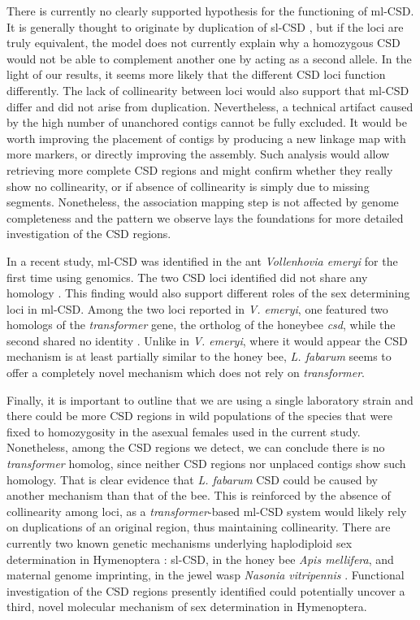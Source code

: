 \documentclass[11pt,a4paper]{report}
\begin{document}
There is currently no clearly supported hypothesis for the functioning of ml-CSD. It is generally thought to originate by duplication of sl-CSD  \citep{Boer2008ExperimentalVestalis,VanWilgenburg2006}, but if the loci are truly equivalent, the model does not currently explain why a homozygous CSD would not be able to complement another one by acting as a second allele. In the light of our results, it seems more likely that the different CSD loci function differently. The lack of collinearity between loci would also support that ml-CSD differ and did not arise from duplication. Nevertheless, a technical artifact caused by the high number of unanchored contigs cannot be fully excluded. It would be worth improving the placement of contigs by producing a new linkage map with more markers, or directly improving the assembly. Such analysis would allow retrieving more complete CSD regions and might confirm whether they really show no collinearity, or if absence of collinearity is simply due to missing segments. Nonetheless, the association mapping step is not affected by genome completeness and the pattern we observe lays the foundations for more detailed investigation of the CSD regions.  

In a recent study, ml-CSD was identified in the ant \textit{Vollenhovia emeryi} for the first time using genomics. The two CSD loci identified did not share any homology \citep{Miyakawa2015}. This finding would also support different roles of the sex determining loci in ml-CSD. Among the two loci reported in \textit{V. emeryi}, one featured two homologs of the \textit{transformer} gene, the ortholog of the honeybee \textit{csd}, while the second shared no identity \citep{Miyakawa2015}. Unlike in \textit{V. emeryi}, where it would appear the CSD mechanism is at least partially similar to the honey bee, \textit{L. fabarum} seems to offer a completely novel mechanism which does not rely on \textit{transformer}.

Finally, it is important to outline that we are using a single laboratory strain and there could be more CSD regions in wild populations of the species that were fixed to homozygosity in the asexual females used in the current study. Nonetheless, among the CSD regions we detect, we can conclude there is no \textit{transformer} homolog, since neither CSD regions nor unplaced contigs show such homology. That is clear evidence that \textit{L. fabarum} CSD could be caused by another mechanism than that of the bee. This is reinforced by the absence of collinearity among loci, as a \textit{transformer}-based ml-CSD system would likely rely on duplications of an original region, thus maintaining collinearity. There are currently two known genetic mechanisms underlying  haplodiploid sex determination in Hymenoptera \citep{VanDeZande2014GenomicDetermination}: sl-CSD, in the honey bee \textit{Apis mellifera}, and maternal genome imprinting, in the jewel wasp \textit{Nasonia vitripennis} \citep{Beukeboom2010}. Functional investigation of the CSD regions presently identified could potentially uncover a third, novel molecular mechanism of sex determination in Hymenoptera.
\end{document}
